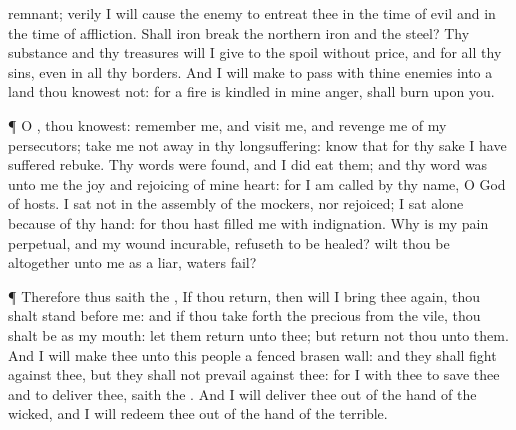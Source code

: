 {remnant;
verily I will cause the
enemy to
entreat thee
{} in the
time of
evil and in the
time of
affliction.
Shall
iron
break the
northern
iron and the
steel?
Thy
substance and thy
treasures will I
give to the
spoil without
price, and
{} for all thy
sins, even in all thy
borders.
And I will make
{} to
pass with thine
enemies into a
land
{} thou
knowest not: for a
fire is
kindled in mine
anger,
{} shall
burn upon you.
\par }{\PP {}¶ O
{}, thou
knowest:
remember me, and
visit me, and
revenge me of my
persecutors; take me not
away in thy
longsuffering:
know that for thy sake I have
suffered
rebuke.
Thy
words were
found, and I did
eat them; and thy
word was unto me the
joy and
rejoicing of mine
heart: for I am
called by thy
name, O
{}
God of
hosts.
I
sat not in the
assembly of the
mockers, nor
rejoiced; I
sat
alone
because of thy
hand: for thou hast
filled me with
indignation.
Why is my
pain
perpetual, and my
wound
incurable,
{}
refuseth to be
healed? wilt thou be altogether unto me as a
liar,
{}
waters
{}
fail?
\par }{\PP {}¶ Therefore thus
saith the
{}, If thou
return, then will I bring thee
again,
{} thou shalt
stand
before me: and if thou take
forth the
precious from the
vile, thou shalt be as my
mouth: let them
return unto thee; but
return not thou unto them.
And I will
make thee unto this
people a
fenced
brasen
wall: and they shall
fight against thee, but they shall not
prevail against thee: for I
{} with thee to
save thee and to
deliver thee,
saith the
{}.
And I will
deliver thee out of the
hand of the
wicked, and I will
redeem thee out of the
hand of the
terrible.

}
